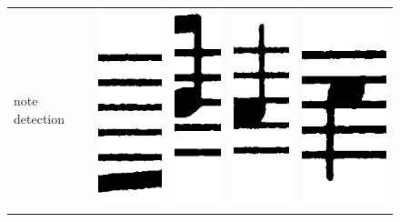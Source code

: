 \documentclass[twocolumn]{article}
\begin{document}
\begin{figure}
\begin{tabular}{l|l l l l}
 note detection  & \includegraphics[scale=0.1]{0.png} & \includegraphics[scale=0.1]{50.png}  & \includegraphics[scale=0.1]{90.png} & \includegraphics[scale=0.1]{100.png} \\

\end{tabular}
\end{figure}
\end{document}
